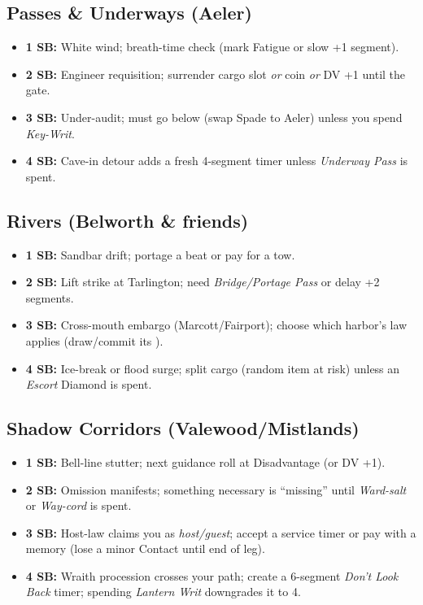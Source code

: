 \documentclass[11pt,letterpaper,twoside]{book}
\begin{document}
\subsection{Passes \& Underways (Aeler)}
\begin{itemize}
  \item \textbf{1 SB:} White wind; breath-time check (mark Fatigue or slow +1 segment).
  \item \textbf{2 SB:} Engineer requisition; surrender cargo slot \emph{or} coin \emph{or} DV +1 until the gate.
  \item \textbf{3 SB:} Under-audit; must go below (swap Spade to Aeler) unless you spend \emph{Key-Writ}.
  \item \textbf{4 SB:} Cave-in detour adds a fresh 4-segment timer unless \emph{Underway Pass} is spent.
\end{itemize}

\subsection{Rivers (Belworth \& friends)}
\begin{itemize}
  \item \textbf{1 SB:} Sandbar drift; portage a beat or pay for a tow.
  \item \textbf{2 SB:} Lift strike at Tarlington; need \emph{Bridge/Portage Pass} or delay +2 segments.
  \item \textbf{3 SB:} Cross-mouth embargo (Marcott/Fairport); choose which harbor's law applies (draw/commit its \SuitDiamond{}).
  \item \textbf{4 SB:} Ice-break or flood surge; split cargo (random item at risk) unless an \emph{Escort} Diamond is spent.
\end{itemize}

\subsection{Shadow Corridors (Valewood/Mistlands)}
\begin{itemize}
  \item \textbf{1 SB:} Bell-line stutter; next guidance roll at Disadvantage (or DV +1).
  \item \textbf{2 SB:} Omission manifests; something necessary is ``missing'' until \emph{Ward-salt} or \emph{Way-cord} is spent.
  \item \textbf{3 SB:} Host-law claims you as \emph{host/guest}; accept a service timer or pay with a memory (lose a minor Contact until end of leg).
  \item \textbf{4 SB:} Wraith procession crosses your path; create a 6-segment \emph{Don't Look Back} timer; spending \emph{Lantern Writ} downgrades it to 4.
\end{itemize}
\end{document}

